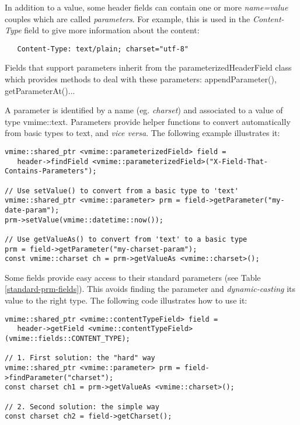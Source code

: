 In addition to a value, some header fields can contain one or more
\emph{name=value} couples which are called \emph{parameters}. For example,
this is used in the \emph{Content-Type} field to give more information about
the content:

\begin{verbatim}
   Content-Type: text/plain; charset="utf-8"
\end{verbatim}

Fields that support parameters inherit from the
{\vcode parameterizedHeaderField} class which provides methods to deal with
these parameters: {\vcode appendParameter()}, {\vcode getParameterAt()}...

A parameter is identified by a name (eg. \emph{charset}) and associated to
a value of type {\vcode vmime::text}. Parameters provide helper functions to
convert automatically from basic types to text, and \emph{vice versa}. The
following example illustrates it:

\begin{lstlisting}[caption={Getting and setting parameter value in fields}]
vmime::shared_ptr <vmime::parameterizedField> field =
   header->findField <vmime::parameterizedField>("X-Field-That-Contains-Parameters");

// Use setValue() to convert from a basic type to 'text'
vmime::shared_ptr <vmime::parameter> prm = field->getParameter("my-date-param");
prm->setValue(vmime::datetime::now());

// Use getValueAs() to convert from 'text' to a basic type
prm = field->getParameter("my-charset-param");
const vmime::charset ch = prm->getValueAs <vmime::charset>();
\end{lstlisting}

Some fields provide easy access to their standard parameters (see
Table \ref{standard-prm-fields}). This avoids finding the parameter and
\emph{dynamic-casting} its value to the right type. The following code
illustrates how to use it:

\begin{lstlisting}
vmime::shared_ptr <vmime::contentTypeField> field =
   header->getField <vmime::contentTypeField>(vmime::fields::CONTENT_TYPE);

// 1. First solution: the "hard" way
vmime::shared_ptr <vmime::parameter> prm = field->findParameter("charset");
const charset ch1 = prm->getValueAs <vmime::charset>();

// 2. Second solution: the simple way
const charset ch2 = field->getCharset();
\end{lstlisting}

